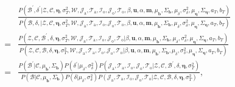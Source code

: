    \begin{equation}
   \begin{aligned}
   & \frac{P(\mathcal{B}^\prime, \delta^\prime |\mathcal{Z},   \mathcal{C},  \boldsymbol{\eta}, \sigma_T^2, \mathcal{W}, \mathcal{J}_{\mbox{a}}, \mathcal{T}_{\mbox{a}},\mathcal{I}_{\mbox{o}}, \mathcal{J}_{\mbox{o}}, \mathcal{T}_{\mbox{o}}, \beta, \boldsymbol{u}, \alpha, \boldsymbol{m}, \mu_{\boldsymbol{b}}, \Sigma_{\boldsymbol{b}}, \mu_\delta, \sigma^2_\delta, \mu_{\boldsymbol{\eta}}, \Sigma_{\boldsymbol{\eta}}, a_T, b_T)}{P(\mathcal{B}, 
   	\delta, |\mathcal{Z},   \mathcal{C}, \boldsymbol{\eta}, \sigma_T^2,\mathcal{W}, \mathcal{J}_{\mbox{a}},\mathcal{T}_{\mbox{a}},\mathcal{I}_{\mbox{o}}, \mathcal{J}_{\mbox{o}}, \mathcal{T}_{\mbox{o}}, \beta, \boldsymbol{u}, \alpha, \boldsymbol{m}, \mu_{\boldsymbol{b}}, \Sigma_{\boldsymbol{b}}, \mu_\delta, \sigma^2_\delta, \mu_{\boldsymbol{\eta}}, \Sigma_{\boldsymbol{\eta}}, a_T, b_T)}\\=&\frac{P(\mathcal{Z}, \mathcal{C}, \mathcal{B}^\prime, \delta, \boldsymbol{\eta}, \sigma_T^2,\mathcal{W},  \mathcal{J}_{\mbox{a}}, \mathcal{T}_{\mbox{a}},\mathcal{I}_{\mbox{o}}, \mathcal{J}_{\mbox{o}}, \mathcal{T}_{\mbox{o}} |\beta, \boldsymbol{u}, \alpha, \boldsymbol{m}, \mu_{\boldsymbol{b}}, \Sigma_{\boldsymbol{b}}, \mu_\delta, \sigma^2_\delta,\mu_{\boldsymbol{\eta}}, \Sigma_{\boldsymbol{\eta}}, a_T, b_T)}{P(\mathcal{Z}, \mathcal{C}, \mathcal{B}, \delta,  \boldsymbol{\eta}, \sigma_T^2,\mathcal{W}, \mathcal{J}_{\mbox{a}},\mathcal{T}_{\mbox{a}}, \mathcal{I}_{\mbox{o}}, \mathcal{J}_{\mbox{o}}, \mathcal{T}_{\mbox{o}} |\beta, \boldsymbol{u}, \alpha, \boldsymbol{m}, \mu_{\boldsymbol{b}}, \Sigma_{\boldsymbol{b}}, \mu_\delta, \sigma^2_\delta,\mu_{\boldsymbol{\eta}}, \Sigma_{\boldsymbol{\eta}}, a_T, b_T)}\\=&\frac{P(\mathcal{B}^\prime|\mathcal{C}, \mu_{\boldsymbol{b}}, \Sigma_{\boldsymbol{b}})P(\delta^\prime|\mu_\delta, \sigma^2_\delta)P(\mathcal{J}_{\mbox{a}},\mathcal{T}_{\mbox{a}}, \mathcal{I}_{\mbox{o}}, \mathcal{J}_{\mbox{o}}, \mathcal{T}_{\mbox{o}} |\mathcal{Z}, \mathcal{C}, \mathcal{B}^\prime, \delta, \boldsymbol{\eta}, \sigma_T^2)}{P(\mathcal{B}|\mathcal{C}, \mu_{\boldsymbol{b}}, \Sigma_{\boldsymbol{b}})P(\delta|\mu_\delta, \sigma^2_\delta)P(\mathcal{J}_{\mbox{a}},\mathcal{T}_{\mbox{a}}, \mathcal{I}_{\mbox{o}}, \mathcal{J}_{\mbox{o}}, \mathcal{T}_{\mbox{o}} |\mathcal{Z}, \mathcal{C}, \mathcal{B}, \delta,\boldsymbol{\eta}, \sigma_T^2)},
   \end{aligned}
   \end{equation}
